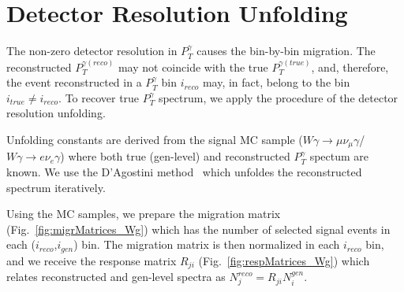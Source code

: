 \section{Detector Resolution Unfolding}
\label{sec:Unfolding}



The non-zero detector resolution in $P_T^\gamma$ causes the bin-by-bin migration. The reconstructed $P_T^{\gamma(reco)}$ may not coincide with the true $P_T^{\gamma(true)}$, and, therefore, the event reconstructed in a $P_T^{\gamma}$ bin $i_{reco}$ may, in fact, belong to the bin $i_{true} \neq i_{reco}$. To recover true $P_T^{\gamma}$ spectrum, we apply the procedure of the detector resolution unfolding.

Unfolding constants are derived from the signal MC sample ($W\gamma\rightarrow\mu\nu_{\mu}\gamma$/$W\gamma\rightarrow{e}\nu_{e}\gamma$) where both true (gen-level) and reconstructed $P_T^\gamma$ spectum are known. We use the D'Agostini method~\cite{ref_DAgostini} which unfoldes the reconstructed spectrum iteratively.  


Using the MC samples, we prepare the migration matrix (Fig.~\ref{fig:migrMatrices_Wg}) which has the number of selected signal events in each ($i_{reco}$,$i_{gen}$) bin. The migration matrix is then normalized in each $i_{reco}$ bin, and we receive the response matrix $R_{ji}$  (Fig.~\ref{fig:respMatrices_Wg}) which relates reconstructed and gen-level spectra as $N^{reco}_j = R_{ji} N^{gen}_i$.


